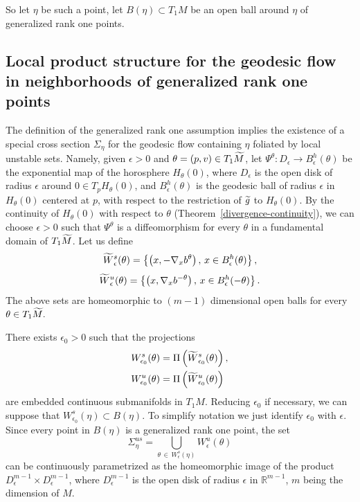 \documentclass[10pt]{amsart}
\theoremstyle{definition}
\newcommand{\bbR}{\mathbb{R}}
\let\oldtilde\tilde
\renewcommand*{\tilde}[1]{\mathchoice{\widetilde{#1}}{\widetilde{#1}}{\oldtilde{#1}}{\oldtilde{#1}}}
\begin{document}
So let $\eta$ be such a point, let $B(\eta) \subset T_{1}M$ be an open ball around $\eta$ of generalized rank one points.

\subsection{Local product structure for the geodesic flow in neighborhoods of generalized rank one points}

The definition of the generalized rank one assumption implies the existence of a special cross section $\Sigma_{\eta}$ for the geodesic flow containing $\eta$ foliated by local unstable sets. Namely, given $\epsilon >0$ and $\theta =(p,v) \in T_{1}\tilde{M}$, let $\Psi^{\theta} : D_{\epsilon} \longrightarrow B_{\epsilon}^{h}(\theta)$ be the exponential map of the horosphere $H_{\theta}(0)$, where $D_{\epsilon}$ is the open disk of radius $\epsilon$ around $0 \in T_{p}H_{\theta}(0)$, and $B_{\epsilon}^{h}(\theta)$ is the geodesic ball of radius $\epsilon$ in $H_{\theta}(0)$ centered at $p$, with respect to the restriction of $\tilde{g}$ to $H_{\theta}(0)$. By the continuity of $H_{\theta}(0)$ with respect to $\theta$ (Theorem~\ref{divergence-continuity}), we can choose $\epsilon >0$ such that $\Psi^{\theta}$ is a diffeomorphism for every $\theta$ in a fundamental domain of $T_{1}\tilde{M}$. Let us define
\[
\tilde{W}^{s}_{\epsilon}(\theta) = \left\{\left(x,-\nabla_{x}b^{\theta}\right),\, x \in B_{\epsilon}^{h}(\theta)\right\},
\]
\[
\tilde{W}^{u}_{\epsilon}(\theta) = \left\{\left(x, \nabla_{x}b^{-\theta}\right),\,x \in B_{\epsilon}^{h}(-\theta)\right\}.
\]
The above sets are homeomorphic to $(m-1)$ dimensional open balls for every $\theta \in T_{1}\tilde{M}.$

There exists $\epsilon_{0}>0$ such that the projections
\begin{align*}
W^{s}_{\epsilon_{0}}(\theta) &= \Pi\left(\tilde{W}^{s}_{\epsilon_{0}}(\theta)\right),
\\
W^{u}_{\epsilon_{0}}(\theta) &= \Pi\left(\tilde{W}^{u}_{\epsilon_{0}}(\theta)\right)
\end{align*}
are embedded continuous submanifolds in $T_{1}M$. Reducing $\epsilon_{0}$ if necessary, we can suppose that $W^{s}_{\epsilon_{0}}(\eta) \subset B(\eta)$. To simplify notation we just identify $\epsilon_{0}$ with $\epsilon$. Since every point in $B(\eta)$ is a generalized rank one point, the set
\[
\Sigma_{\eta}^{us} = \bigcup_{\theta\,\in\,W^{s}_{\epsilon}(\eta)} W^{u}_{\epsilon}(\theta)
\]
can be continuously parametrized as the homeomorphic image of the product $D^{m-1}_{\epsilon} \times D^{m-1}_{\epsilon}$, where $D^{m-1}_{\epsilon}$ is the open disk of radius $\epsilon$ in $\bbR^{m-1}$, $m$ being the dimension of $M$.
\end{document}
